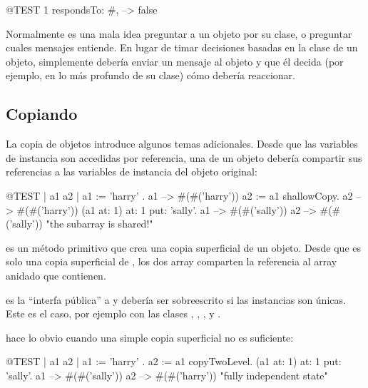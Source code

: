 \documentclass[a4paper,10pt,twoside]{book}
\begin{document}
\begin{code}{@TEST}
1 respondsTo: #, --> false
\end{code}

Normalmente es una mala idea preguntar a un objeto por su clase, o preguntar cuales mensajes entiende. En lugar de timar decisiones basadas en la clase de un objeto, simplemente deber\'ia enviar un mensaje al objeto y que \'el decida (por ejemplo, en lo m\'as profundo de su clase) c\'omo deber\'ia reaccionar.

\subsection{Copiando}

La copia de objetos introduce algunos temas adicionales. Desde que las variables de instancia son accedidas por referencia, una  de un objeto deber\'ia compartir sus referencias a las variables de instancia del objeto original:


\begin{code}{@TEST | a1 a2 |}
a1 := { { 'harry' } }.
a1 --> #(#('harry'))
a2 := a1 shallowCopy.
a2 --> #(#('harry'))
(a1 at: 1) at: 1 put: 'sally'.
a1 --> #(#('sally'))
a2 --> #(#('sally'))    "the subarray is shared!"
\end{code}

 es un m\'etodo primitivo que crea una copia superficial de un objeto. Desde que  es solo una copia superficial de  , los dos array comparten la referencia al array anidado que contienen.

 es la ``interfa p\'ublica'' a  y deber\'ia ser sobreescrito si las instancias son \'unicas. Este es el caso, por ejemplo con las clases , , ,  y .

 hace lo obvio cuando una simple copia superficial no es suficiente:

\begin{code}{@TEST | a1 a2 |}
a1 := { { 'harry' } } .
a2 := a1 copyTwoLevel.
(a1 at: 1) at: 1 put: 'sally'.
a1 --> #(#('sally'))
a2 --> #(#('harry'))    "fully independent state"
\end{code}
\end{document}
